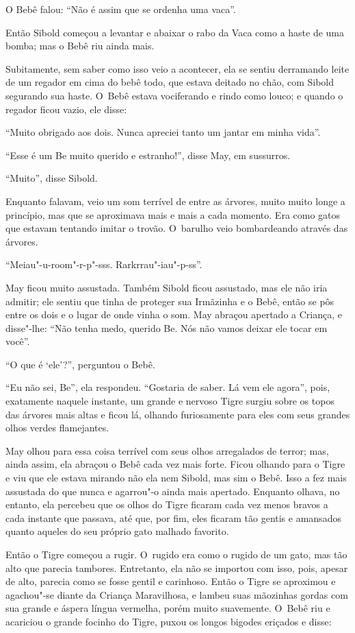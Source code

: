 O Bebê falou: ``Não é assim que se ordenha uma vaca''.


Então Sibold começou a levantar e abaixar o rabo da Vaca como a haste de
uma bomba; mas o Bebê riu ainda mais.

Subitamente, sem saber como isso veio a acontecer, ela se sentiu
derramando leite de um regador em cima do bebê todo, que estava deitado
no chão, com Sibold segurando sua haste. O~Bebê estava vociferando e
rindo como louco; e quando o regador ficou vazio, ele disse:

``Muito obrigado aos dois. Nunca apreciei tanto um jantar em minha
vida''.

``Esse é um Be muito querido e estranho!'', disse May, em sussurros.

``Muito'', disse Sibold.

Enquanto falavam, veio um som terrível de entre as árvores, muito muito
longe a princípio, mas que se aproximava mais e mais a cada momento. Era
como gatos que estavam tentando imitar o trovão. O~barulho veio
bombardeando através das árvores.

``Meiau"-u-room"-r-p"-sss. Rarkrrau"-iau"-p-ss''.

May ficou muito assustada. Também Sibold ficou assustado, mas ele não
iria admitir; ele sentiu que tinha de proteger sua Irmãzinha e o Bebê,
então se pôs entre os dois e o lugar de onde vinha o som. May abraçou
apertado a Criança, e disse"-lhe: ``Não tenha medo, querido Be. Nós não
vamos deixar ele tocar em você''.

``O que é `ele'?'', perguntou o Bebê.

``Eu não sei, Be'', ela respondeu. ``Gostaria de saber. Lá vem ele
agora'', pois, exatamente naquele instante, um grande e nervoso Tigre
surgiu sobre os topos das árvores mais altas e ficou lá, olhando
furiosamente para eles com seus grandes olhos verdes flamejantes.

May olhou para essa coisa terrível com seus olhos arregalados de terror;
mas, ainda assim, ela abraçou o Bebê cada vez mais forte. Ficou olhando
para o Tigre e viu que ele estava mirando não ela nem Sibold, mas sim o
Bebê. Isso a fez mais assustada do que nunca e agarrou"-o ainda mais
apertado. Enquanto olhava, no entanto, ela percebeu que os olhos do
Tigre ficaram cada vez menos bravos a cada instante que passava, até
que, por fim, eles ficaram tão gentis e amansados quanto aqueles do seu
próprio gato malhado favorito.

Então o Tigre começou a rugir. O~rugido era como o rugido de um gato,
mas tão alto que parecia tambores. Entretanto, ela não se importou com
isso, pois, apesar de alto, parecia como se fosse gentil e carinhoso.
Então o Tigre se aproximou e agachou"-se diante da Criança Maravilhosa, e
lambeu suas mãozinhas gordas com sua grande e áspera língua vermelha,
porém muito suavemente. O~Bebê riu e acariciou o grande focinho do
Tigre, puxou os longos bigodes eriçados e disse:

